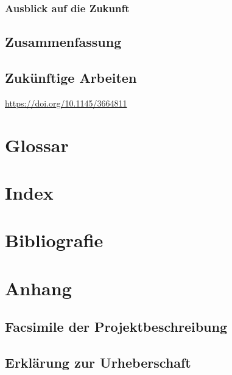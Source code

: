 \documentclass[a4paper,12pt]{report}
\begin{document}
    \subsection{Ausblick auf die Zukunft}


    \section{Zusammenfassung}


    \section{Zukünftige Arbeiten}\label{sec:zukunftigearbeiten}
    \url{https://doi.org/10.1145/3664811}


    \chapter{Glossar}


    \chapter{Index}


    \chapter{Bibliografie}


    \chapter{Anhang}


    \section{Facsimile der Projektbeschreibung}


    \section{Erklärung zur Urheberschaft}
\end{document}
